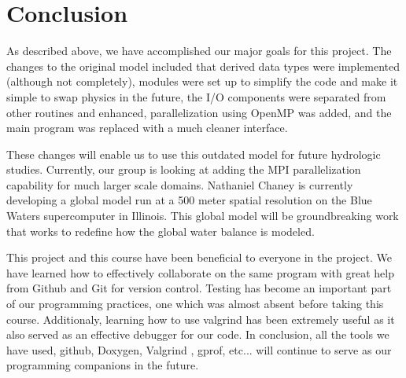 \documentclass[pdftex,12pt,a4paper]{article}
\begin{document}
\section{Conclusion}

As described above, we have accomplished our major goals for this project. The changes to the original model included that derived data types were implemented (although not completely), modules were set up to simplify the code and make it simple to swap physics in the future, the I/O components were separated from other routines and enhanced, parallelization using OpenMP was added, and the main program was replaced with a much cleaner interface. 

These changes will enable us to use this outdated model for future hydrologic studies. Currently, our group is looking at adding the MPI parallelization capability for much larger scale domains. Nathaniel Chaney is currently developing a global model run at a 500 meter spatial resolution on the Blue Waters supercomputer in Illinois. This global model will be groundbreaking work that works to redefine how the global water balance is modeled.

This project and this course have been beneficial to everyone in the project. We have learned how to effectively collaborate on the same program with great help from Github and Git for version control. Testing has become an important part of our programming practices, one which was almost absent before taking this course. Additionaly, learning how to use valgrind has been extremely useful as it also served as an effective debugger for our code. In conclusion, all the tools we have used, github, Doxygen, Valgrind , gprof, etc... will continue to serve as our programming companions in the future.
\end{document}
